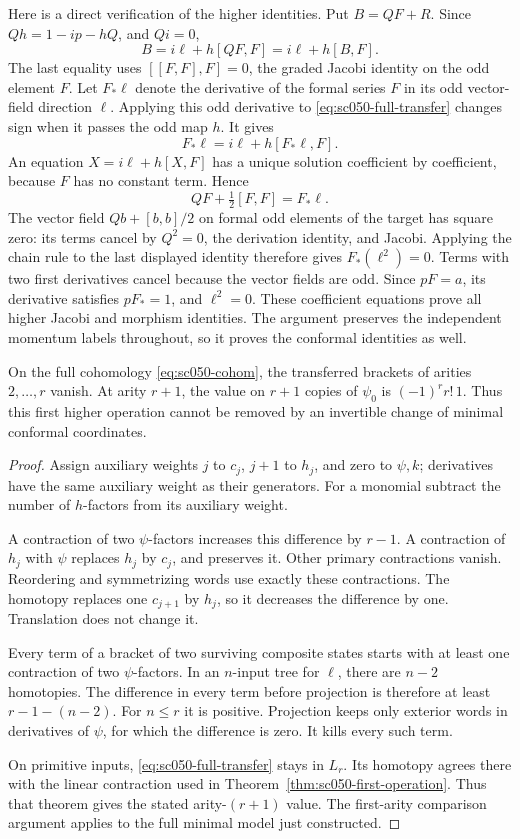 Here is a direct verification of the higher identities. Put
\(B=QF+R\). Since \(Qh=1-ip-hQ\), and \(Qi=0\),
\[
 B=i\ell+h[QF,F]=i\ell+h[B,F].
\]
The last equality uses \([[F,F],F]=0\), the graded Jacobi identity
on the odd element \(F\). Let \(F_*\ell\) denote the derivative
of the formal series \(F\) in its odd vector-field direction
\(\ell\). Applying this odd derivative to \eqref{eq:sc050-full-transfer}
changes sign when it passes the odd map \(h\). It gives
\[
 F_*\ell=i\ell+h[F_*\ell,F].
\]
An equation \(X=i\ell+h[X,F]\) has a unique solution coefficient
by coefficient, because \(F\) has no constant term. Hence
\[
 QF+\tfrac12[F,F]=F_*\ell.
\]
The vector field \(Qb+[b,b]/2\) on formal odd elements of the target
has square zero: its terms cancel by \(Q^2=0\), the derivation
identity, and Jacobi. Applying the chain rule to the last displayed
identity therefore gives \(F_*(\ell^2)=0\). Terms with two first
derivatives cancel because the vector fields are odd. Since
\(pF=a\), its derivative satisfies \(pF_*=1\), and \(\ell^2=0\).
These coefficient equations prove all higher Jacobi and morphism
identities. The argument preserves the independent momentum labels
throughout, so it proves the conformal identities as well.

\begin{proposition}\label{prop:sc050-full-obstruction}
On the full cohomology \eqref{eq:sc050-cohom}, the transferred
brackets of arities \(2,\ldots,r\) vanish. At arity \(r+1\), the
value on \(r+1\) copies of \(\psi_0\) is \((-1)^r r!\,1\).
Thus this first higher operation cannot be removed by an
invertible change of minimal conformal coordinates.
\end{proposition}
\begin{proof}
Assign auxiliary weights \(j\) to \(c_j\), \(j+1\) to \(h_j\),
and zero to \(\psi,k\); derivatives have the same auxiliary
weight as their generators. For a monomial subtract the number
of \(h\)-factors from its auxiliary weight.

A contraction of two \(\psi\)-factors increases this difference by
\(r-1\). A contraction of \(h_j\) with \(\psi\) replaces \(h_j\)
by \(c_j\), and preserves it. Other primary contractions vanish.
Reordering and symmetrizing words use exactly these contractions.
The homotopy replaces one \(c_{j+1}\) by \(h_j\), so it decreases
the difference by one. Translation does not change it.

Every term of a bracket of two surviving composite states starts
with at least one contraction of two \(\psi\)-factors. In an
\(n\)-input tree for \(\ell\), there are \(n-2\) homotopies.
The difference in every term before projection is therefore at
least \(r-1-(n-2)\). For \(n\le r\) it is positive. Projection
keeps only exterior words in derivatives of \(\psi\), for which
the difference is zero. It kills every such term.

On primitive inputs, \eqref{eq:sc050-full-transfer} stays in
\(L_r\). Its homotopy agrees there with the linear contraction
used in Theorem~\ref{thm:sc050-first-operation}. Thus that theorem
gives the stated arity-\((r+1)\) value. The first-arity comparison
argument applies to the full minimal model just constructed.
\end{proof}

